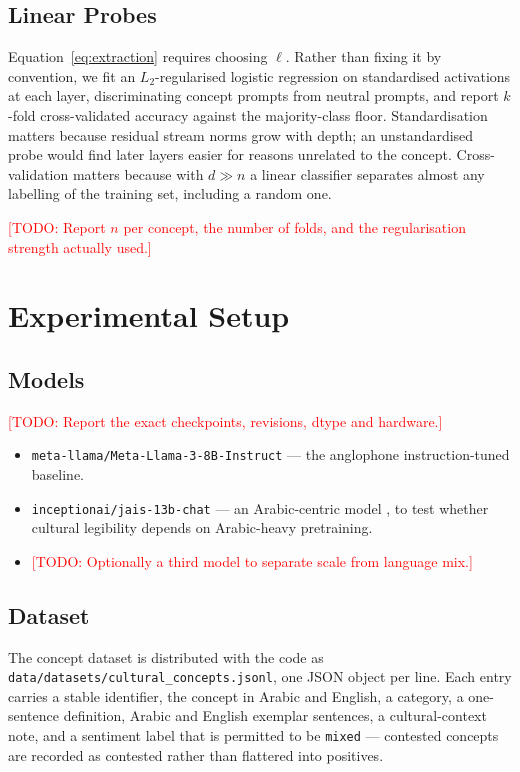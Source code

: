 \documentclass[11pt,a4paper]{article}
\newcommand{\todo}[1]{\textcolor{red}{[TODO: #1]}}
\begin{document}
\subsection{Linear Probes}
\label{sec:probes}

Equation~\ref{eq:extraction} requires choosing $\ell$. Rather than fixing it by
convention, we fit an $L_2$-regularised logistic regression on standardised
activations at each layer, discriminating concept prompts from neutral prompts,
and report $k$-fold cross-validated accuracy against the majority-class floor.
Standardisation matters because residual stream norms grow with depth; an
unstandardised probe would find later layers easier for reasons unrelated to
the concept. Cross-validation matters because with $d \gg n$ a linear
classifier separates almost any labelling of the training set, including a
random one.

\todo{Report $n$ per concept, the number of folds, and the regularisation
strength actually used.}

\section{Experimental Setup}
\label{sec:setup}

\subsection{Models}
\todo{Report the exact checkpoints, revisions, dtype and hardware.}
\begin{itemize}
  \item \texttt{meta-llama/Meta-Llama-3-8B-Instruct} --- the anglophone
        instruction-tuned baseline.
  \item \texttt{inceptionai/jais-13b-chat} --- an Arabic-centric model
        \citep{sengupta2023jais}, to test whether cultural legibility depends
        on Arabic-heavy pretraining.
  \item \todo{Optionally a third model to separate scale from language mix.}
\end{itemize}

\subsection{Dataset}
The concept dataset is distributed with the code as
\texttt{data/datasets/cultural\_concepts.jsonl}, one JSON object per line.
Each entry carries a stable identifier, the concept in Arabic and English, a
category, a one-sentence definition, Arabic and English exemplar sentences,
a cultural-context note, and a sentiment label that is permitted to be
\texttt{mixed} --- contested concepts are recorded as contested rather than
flattered into positives.
\end{document}

